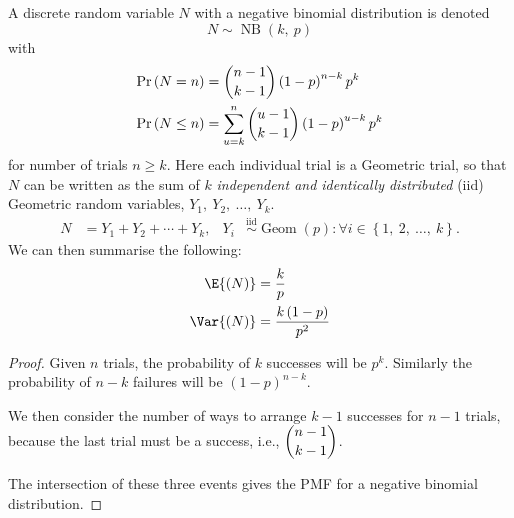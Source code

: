 \documentclass{article}
\begin{document}
\begin{multicols}{3}
    A discrete random variable \(N\) with a negative binomial distribution is denoted
    \begin{equation*}
        N \sim \operatorname{NB}{\left( k,\: p \right)}
    \end{equation*}
    with
    \begin{align*}
        \Pr{\left( N = n \right)}    & = \dbinom{n - 1}{k - 1} \left( 1 - p \right)^{n - k} p^k                \\
        \Pr{\left( N \leq n \right)} & = \sum_{u = k}^n \dbinom{u - 1}{k - 1} \left( 1 - p \right)^{u - k} p^k
    \end{align*}
    for number of trials \(n \geq k\).
    Here each individual trial is a Geometric trial, so that \(N\) can be written as the sum of
    \(k\) \textit{independent and identically distributed} (iid) Geometric random variables, \(Y_1,\: Y_2,\: \dots,\: Y_k\).
    \begin{align*}
        N & = Y_1 + Y_2 + \cdots + Y_k, & Y_i & \overset{\mathrm{iid}}{\sim} \operatorname{Geom}{\left( p \right)} : \forall i \in \left\{ 1,\: 2,\: \dots,\: k \right\}.
    \end{align*}
    We can then summarise the following:
    \begin{align*}
        \E{\left( N \right)}   & = \frac{k}{p}                        \\
        \Var{\left( N \right)} & = \frac{k \left( 1 - p \right)}{p^2}
    \end{align*}
    \begin{proof}
        Given \(n\) trials, the probability of \(k\) successes will be \(p^k\).
        Similarly the probability of \(n - k\) failures will be \(\left( 1 - p \right)^{n - k}\).

        We then consider the number of ways to arrange \(k - 1\) successes for \(n - 1\) trials,
        because the last trial must be a success, i.e., \(\dbinom{n - 1}{k - 1}\).

        The intersection of these three events gives the PMF for a negative binomial distribution.
    \end{proof}

\end{multicols}
\end{document}
